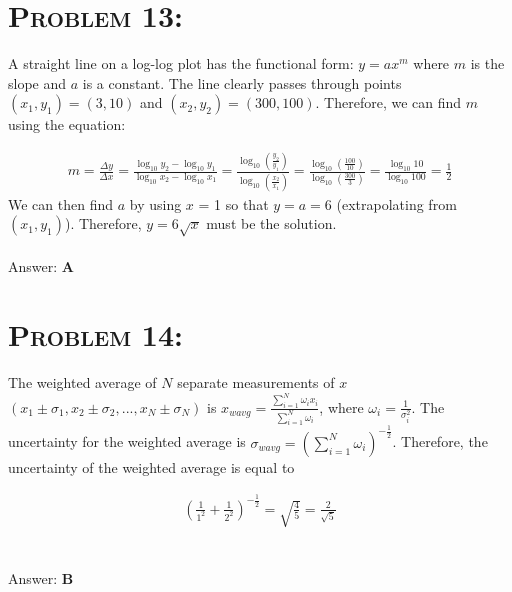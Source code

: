 \documentclass{article}
\begin{document}

\section{\textsc{Problem 13:}} A straight line on a log-log plot has the functional form: \textbf{$y = ax^{m}$} where $m$ is the slope and $a$ is a constant. The line clearly passes through points $(x_{1}, y_{1} ) = (3,10)$ and $(x_{2}, y_{2} ) = (300,100)$. Therefore, we can find $m$ using the equation:

\begin{align}
m =\frac{\Delta y}{ \Delta x} = \frac{\log_{10} y_{2} - \log_{10} y_{1}}{\log_{10} x_{2} - \log_{10} x_{1}} = \frac{\log_{10}\left(\frac{y_{2}}{y_{1}}\right)}{\log_{10}\left(\frac{x_{2}}{x_{1}}\right)} = \frac{\log_{10}\left(\frac{100}{10}\right)}{\log_{10}\left(\frac{300}{3}\right)} = \frac{\log_{10}10}{\log_{10}100} = \frac{1}{2}\nonumber
\end{align}
We can then find $a$ by using $x$ = 1 so that $y = a = 6$ (extrapolating from $(x_{1}, y_{1})$). Therefore, $y = 6\sqrt{x}$ must be the solution.
\\\\
Answer: \textbf{\textcolor{ProcessBlue}A}\\


\section{\textsc{Problem 14:}} The weighted average of $N$ separate measurements  of $x$ $(x_1\pm\sigma_1, x_2\pm\sigma_2, ..., x_N\pm\sigma_N)$ is $x_{wavg} = \frac{\sum_{i=1}^{N}\omega_i x_i}{\sum_{i=1}^{N}\omega_i}$, where $\omega_i = \frac{1}{\sigma_i^2}$. The uncertainty for the weighted average is $\sigma_{wavg} = \left(\sum_{i=1}^{N}\omega_i\right)^{-\frac{1}{2}}$. Therefore, the uncertainty of the weighted average is equal to

\begin{align}
\left(\frac{1}{1^2}+\frac{1}{2^2}\right)^{-\frac{1}{2}}= \sqrt{\frac{4}{5}} = \boxed{\frac{2}{\sqrt{5}}}\nonumber
\end{align}
\\\\
Answer: \textbf{\textcolor{ProcessBlue}B}\\

\end{document}
